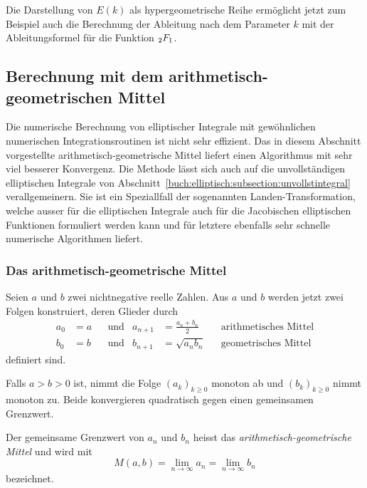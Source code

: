 Die Darstellung von $E(k)$ als hypergeometrische Reihe ermöglicht
jetzt zum Beispiel auch die Berechnung der Ableitung nach dem
Parameter $k$ mit der Ableitungsformel für die Funktion $\mathstrut_2F_1$.


%
%
\subsection{Berechnung mit dem arithmetisch-geometrischen Mittel}
Die numerische Berechnung von elliptischer Integrale mit gewöhnlichen
numerischen Integrationsroutinen ist nicht sehr effizient.
Das in diesem Abschnitt vorgestellte arithmetisch-geometrische Mittel
%
liefert einen Algorithmus mit sehr viel besserer Konvergenz.
Die Methode lässt sich auch auf die unvollständigen elliptischen
Integrale von Abschnitt~\eqref{buch:elliptisch:subsection:unvollstintegral}
verallgemeinern.
Sie ist ein Speziallfall der sogenannten Landen-Transformation,
%
welche ausser für die elliptischen Integrale auch für die 
Jacobischen elliptischen Funktionen formuliert werden kann und
für letztere ebenfalls sehr schnelle numerische Algorithmen liefert.

%
%
\subsubsection{Das arithmetisch-geometrische Mittel}
Seien $a$ und $b$ zwei nichtnegative reelle Zahlen.
Aus $a$ und $b$ werden jetzt zwei Folgen konstruiert, deren Glieder
durch
\begin{align*}
a_0&=a &&\text{und}& a_{n+1} &= \frac{a_n+b_n}2 &&\text{arithmetisches Mittel}
\\
b_0&=b &&\text{und}& b_{n+1} &= \sqrt{a_nb_n}   &&\text{geometrisches Mittel}
\end{align*}
definiert sind.

\begin{satz}
Falls $a>b>0$ ist, nimmt die Folge $(a_k)_{k\ge 0}$ monoton ab und
$(b_k)_{k\ge 0}$ nimmt monoton zu.
Beide konvergieren quadratisch gegen einen gemeinsamen Grenzwert.
\end{satz}

\begin{definition}
Der gemeinsame Grenzwert von $a_n$ und $b_n$ heisst das
{\em arithmetisch-geometrische Mittel} und wird mit 
\[
M(a,b)
=
\lim_{n\to\infty} a_n
=
\lim_{n\to\infty} b_n
\]
bezeichnet.
%
\end{definition}

